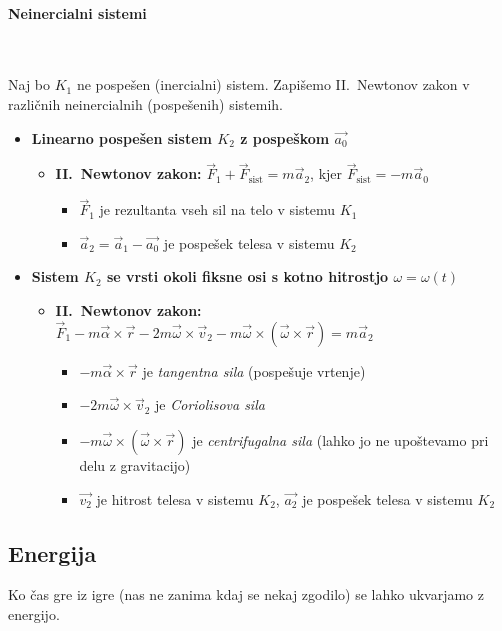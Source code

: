 \paragraph{Neinercialni sistemi} \ 

Naj bo \(K_1\) ne pospešen (inercialni) sistem. Zapišemo II.\ Newtonov zakon v različnih neinercialnih (pospešenih) sistemih.
\begin{itemize}
    \item \textbf{Linearno pospešen sistem \(K_2\) z pospeškom \(\vec{a_0}\)} 
   
   \begin{itemize}
    \item \textbf{II.\ Newtonov zakon:} \(\boxed{\vec{F}_1 + \vec{F}_\text{sist} = m \vec{a}_2}\), kjer \(\vec{F}_\text{sist} = - m \vec{a}_0\)
     \begin{itemize}
         \item \(\vec{F}_1\) je rezultanta vseh sil na telo v sistemu \(K_1\)
         \item \(\vec{a}_2 = \vec{a}_1 - \vec{a_0}\) je pospešek telesa v sistemu \(K_2\)
     \end{itemize}
   \end{itemize}
    \item \textbf{Sistem \(K_2\) se vrsti okoli fiksne osi s kotno hitrostjo \(\omega = \omega(t)\)}
    \begin{itemize}
        \item \textbf{II.\ Newtonov zakon:} \(\boxed{\vec{F}_1 - m \vec{\alpha} \times \vec{r} - 2m \vec{\omega} \times \vec{v}_2 - m \vec{\omega} \times (\vec{\omega} \times \vec{r}) = m \vec{a}_2}\)
        \begin{itemize}
            \item \(-m \vec{\alpha} \times \vec{r}\) je \emph{tangentna sila} (pospešuje vrtenje)
            \item \(-2m \vec{\omega} \times \vec{v}_2\) je \emph{Coriolisova sila}
            \item \(-m \vec{\omega} \times (\vec{\omega} \times \vec{r})\) je \emph{centrifugalna sila} (lahko jo ne upoštevamo pri delu z gravitacijo)
            \item \(\vec{v_2}\) je hitrost telesa v sistemu \(K_2\), \(\vec{a_2}\) je pospešek telesa v sistemu \(K_2\)
        \end{itemize}
    \end{itemize}
\end{itemize}

\newpage
\subsection{Energija}
Ko čas gre iz igre (nas ne zanima kdaj se nekaj zgodilo) se lahko ukvarjamo z energijo.
